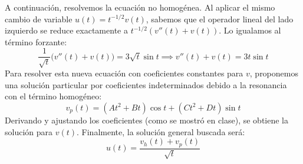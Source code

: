{    A continuación, resolvemos la ecuación no homogénea. Al aplicar el mismo cambio de variable $u(t) = t^{-1/2} v(t)$, sabemos que el operador lineal del lado izquierdo se reduce exactamente a $t^{-1/2}(v''(t) + v(t))$. Lo igualamos al término forzante:
    \[
        \frac{1}{\sqrt{t}} \big( v''(t) + v(t) \big) = 3\sqrt{t} \sin t \implies v''(t) + v(t) = 3t \sin t
    \]
    Para resolver esta nueva ecuación con coeficientes constantes para $v$, proponemos una solución particular por coeficientes indeterminados debido a la resonancia con el término homogéneo:
    \[
        v_p(t) = (A t^2 + B t) \cos t + (C t^2 + D t) \sin t
    \]
    Derivando y ajustando los coeficientes (como se mostró en clase), se obtiene la solución para $v(t)$. Finalmente, la solución general buscada será:
    \[
        u(t) = \frac{v_h(t) + v_p(t)}{\sqrt{t}}
    \]
}

